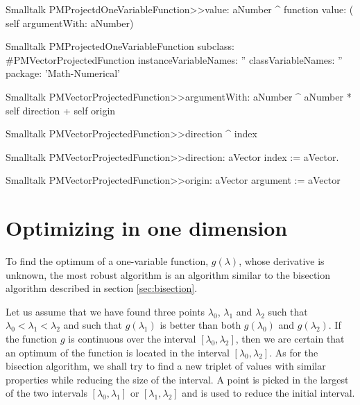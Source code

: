 \begin{displaycode}{Smalltalk}
PMProjectdOneVariableFunction>>value: aNumber
    ^ function value: ( self argumentWith: aNumber)
\end{displaycode}


\begin{displaycode}{Smalltalk}
PMProjectedOneVariableFunction subclass: #PMVectorProjectedFunction
   instanceVariableNames: ''
   classVariableNames: ''
   package: 'Math-Numerical'
\end{displaycode}

\begin{displaycode}{Smalltalk}
PMVectorProjectedFunction>>argumentWith: aNumber
    ^ aNumber * self direction + self origin
\end{displaycode}

\begin{displaycode}{Smalltalk}
PMVectorProjectedFunction>>direction
    ^ index
\end{displaycode}

\begin{displaycode}{Smalltalk}
PMVectorProjectedFunction>>direction: aVector
    index := aVector.
\end{displaycode}

\begin{displaycode}{Smalltalk}
PMVectorProjectedFunction>>origin}
    ^ argument
\end{displaycode}

\begin{displaycode}{Smalltalk}
PMVectorProjectedFunction>>origin: aVector
    argument := aVector
\end{displaycode}


\section{Optimizing in one dimension}
\label{sec:optonedim} To find the optimum of a one-variable
function, $g\left(\lambda\right)$, whose derivative is unknown,
the most robust algorithm is an algorithm similar to the bisection
algorithm described in section \ref{sec:bisection}.

Let us assume that we have found three points $\lambda_0$,
$\lambda_1$ and $\lambda_2$ such that
$\lambda_0<\lambda_1<\lambda_2$ and such that
$g\left(\lambda_1\right)$ is better than both
$g\left(\lambda_0\right)$ and $g\left(\lambda_2\right)$. If the
function $g$ is continuous over the interval
$$, then we are certain that an
optimum of the function is located in the interval
$$. As for the bisection
algorithm, we shall try to find a new triplet of values with
similar properties while reducing the size of the interval. A
point is picked in the largest of the two intervals
$$ or
$$ and is used to reduce the
initial interval.

